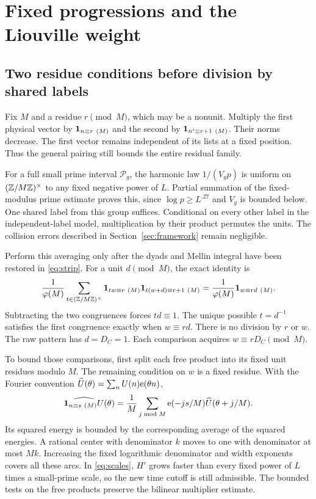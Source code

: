 \section{Fixed progressions and the Liouville weight}\label{sec:parity}

\subsection{Two residue conditions before division by shared labels}

Fix $M$ and a residue $r\pmod M$, which may be a nonunit. Multiply
the first physical vector by $\mathbf 1_{n\equiv r\ (M)}$ and the second
by $\mathbf 1_{n'\equiv r+1\ (M)}$. Their norms decrease. The first vector
remains independent of its lists at a fixed position. Thus the general
pairing still bounds the entire residual family.

For a full small prime interval $\mathcal P_g$, the harmonic law
$1/(V_gp)$ is uniform on $(\mathbb Z/M\mathbb Z)^\times$ to any fixed negative
power of $L$. Partial summation of the fixed-modulus prime estimate
proves this, since $\log p\geq L^{.27}$ and $V_g$ is bounded below.
One shared label from this group suffices. Conditional on every other
label in the independent-label model, multiplication by their product
permutes the units. The collision errors described in
Section~\ref{sec:framework} remain negligible.

Perform this averaging only after the dyads and Mellin integral have
been restored in \eqref{eq:strip}. For a unit $d\pmod M$, the exact
identity is
\begin{equation}\label{eq:orbit}
 \frac1{\varphi(M)}\sum_{t\in(\mathbb Z/M\mathbb Z)^\times}
 \mathbf 1_{tw\equiv r\ (M)}\mathbf 1_{t(w+d)\equiv r+1\ (M)}
 =\frac1{\varphi(M)}\mathbf 1_{w\equiv rd\ (M)}.
\end{equation}
Subtracting the two congruences forces $td\equiv1$. The unique
possible $t=d^{-1}$ satisfies the first congruence exactly when
$w\equiv rd$. There is no division by $r$ or $w$.
The raw pattern has $d=D_C=1$. Each comparison acquires
$w\equiv rD_C\pmod M$.

To bound those comparisons, first split each free product into its
fixed unit residues modulo $M$. The remaining condition on $w$ is a
fixed residue. With the Fourier convention
$\widehat U(\theta)=\sum_n U(n)\mathrm e(\theta n)$,
\[
 \widehat{\mathbf 1_{n\equiv s\ (M)}U}(\theta)
  =\frac1M\sum_{j\bmod M}\mathrm e(-js/M)\widehat U(\theta+j/M).
\]
Its squared energy is bounded by the corresponding average of the
squared energies. A rational center with denominator $k$ moves to
one with denominator at most $Mk$. Increasing the fixed logarithmic
denominator and width exponents covers all these arcs. In
\eqref{eq:scales}, $H'$ grows faster than every fixed power of $L$
times a small-prime scale, so the new time cutoff is still admissible.
The bounded tests on the free products preserve the bilinear multiplier
estimate.

